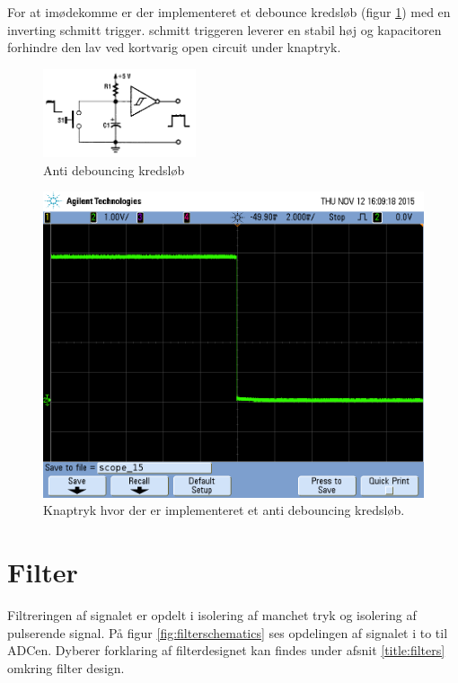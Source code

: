 For at imødekomme  er der implementeret et debounce kredsløb (figur \ref{fig:antidebouncingcircuit}) med en inverting schmitt trigger. schmitt triggeren leverer en stabil høj og kapacitoren forhindre den lav ved kortvarig open circuit under knaptryk. 
\begin{figure}[H]
	\centering
	\includegraphics[width = 0.4\textwidth]{billeder/debounceSchematic.png}
	\caption{Anti debouncing kredsløb}\label{fig:antidebouncingcircuit}
\end{figure}

\begin{figure}[H]
	\includegraphics[width = \textwidth]{billeder/scope_15.png}
	\caption{Knaptryk hvor der er implementeret et anti debouncing kredsløb.}\label{fig:withoutbounce}
\end{figure}


\section{Filter}
Filtreringen af signalet er opdelt i isolering af manchet tryk og isolering af pulserende signal. På figur \ref{fig:filterschematics} ses opdelingen af signalet i to til ADCen. Dyberer forklaring af filterdesignet kan findes under afsnit \ref{title:filters} omkring filter design.

